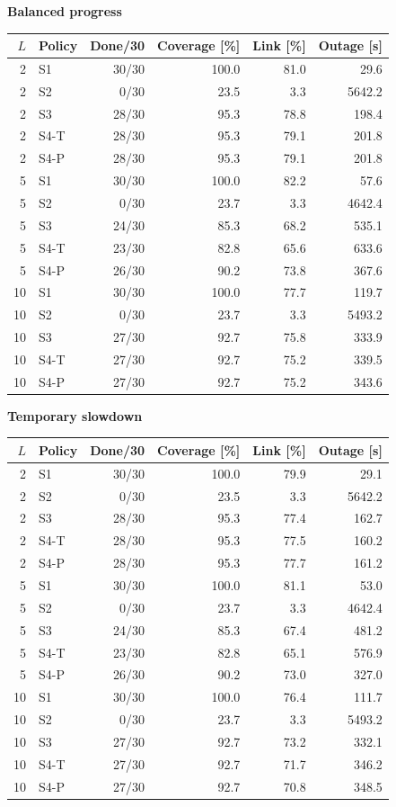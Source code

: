 \par\noindent\textbf{Balanced progress}\par
\begin{tabular}{rlrrrr}\toprule
$L$ & Policy & Done/30 & Coverage [\%] & Link [\%] & Outage [s]\\\midrule
2 & S1 & 30/30 & 100.0 & 81.0 & 29.6\\
2 & S2 & 0/30 & 23.5 & 3.3 & 5642.2\\
2 & S3 & 28/30 & 95.3 & 78.8 & 198.4\\
2 & S4-T & 28/30 & 95.3 & 79.1 & 201.8\\
2 & S4-P & 28/30 & 95.3 & 79.1 & 201.8\\
5 & S1 & 30/30 & 100.0 & 82.2 & 57.6\\
5 & S2 & 0/30 & 23.7 & 3.3 & 4642.4\\
5 & S3 & 24/30 & 85.3 & 68.2 & 535.1\\
5 & S4-T & 23/30 & 82.8 & 65.6 & 633.6\\
5 & S4-P & 26/30 & 90.2 & 73.8 & 367.6\\
10 & S1 & 30/30 & 100.0 & 77.7 & 119.7\\
10 & S2 & 0/30 & 23.7 & 3.3 & 5493.2\\
10 & S3 & 27/30 & 92.7 & 75.8 & 333.9\\
10 & S4-T & 27/30 & 92.7 & 75.2 & 339.5\\
10 & S4-P & 27/30 & 92.7 & 75.2 & 343.6\\
\bottomrule\end{tabular}

\medskip
\par\noindent\textbf{Temporary slowdown}\par
\begin{tabular}{rlrrrr}\toprule
$L$ & Policy & Done/30 & Coverage [\%] & Link [\%] & Outage [s]\\\midrule
2 & S1 & 30/30 & 100.0 & 79.9 & 29.1\\
2 & S2 & 0/30 & 23.5 & 3.3 & 5642.2\\
2 & S3 & 28/30 & 95.3 & 77.4 & 162.7\\
2 & S4-T & 28/30 & 95.3 & 77.5 & 160.2\\
2 & S4-P & 28/30 & 95.3 & 77.7 & 161.2\\
5 & S1 & 30/30 & 100.0 & 81.1 & 53.0\\
5 & S2 & 0/30 & 23.7 & 3.3 & 4642.4\\
5 & S3 & 24/30 & 85.3 & 67.4 & 481.2\\
5 & S4-T & 23/30 & 82.8 & 65.1 & 576.9\\
5 & S4-P & 26/30 & 90.2 & 73.0 & 327.0\\
10 & S1 & 30/30 & 100.0 & 76.4 & 111.7\\
10 & S2 & 0/30 & 23.7 & 3.3 & 5493.2\\
10 & S3 & 27/30 & 92.7 & 73.2 & 332.1\\
10 & S4-T & 27/30 & 92.7 & 71.7 & 346.2\\
10 & S4-P & 27/30 & 92.7 & 70.8 & 348.5\\
\bottomrule\end{tabular}
